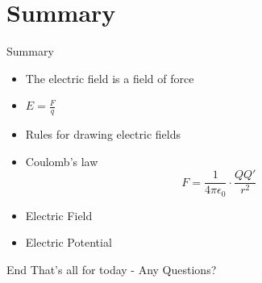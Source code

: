 \documentclass{beamer}
\begin{document}
\section*{Summary}

\begin{frame}{Summary}
  \begin{itemize}
  \item The electric field is a field of force
  \item \(E=\frac{F}{q}\)
  \item Rules for drawing electric fields
  \item Coulomb's law
  \[F=\frac{1}{4\pi \epsilon_0} \cdot \frac{QQ\prime}{r^2} \]
  \item Electric Field
  \item Electric Potential
  \
  \end{itemize}
\end{frame}

\begin{frame}{End}
That's all for today - Any Questions?
\end{frame}
\end{document}
